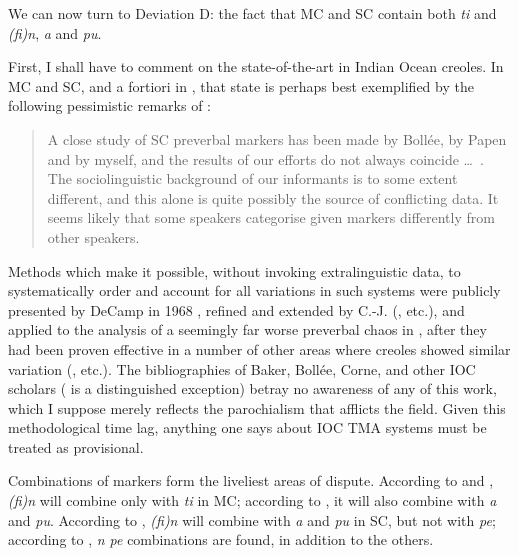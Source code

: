We can now turn to Deviation D: the fact that MC and SC contain both \textit{ti} and \textit{(fi)n}, \textit{a} and \textit{pu}.

First, I shall have to comment on the state-of-the-art in Indian Ocean creoles. In MC and SC, and a fortiori in , that state is perhaps best exemplified by the following pessimistic remarks of \citet[94--95]{Corne1977}:

\begin{quote}
A close study of SC preverbal markers has been made by Bollée, by Papen and by myself, and the results of our efforts do not always coincide \ldots~. The sociolinguistic background of our informants is to some extent different, and this alone is quite possibly the source of conflicting data. It seems likely that some speakers categorise given markers differently from other speakers.
\end{quote}

Methods which make it possible, without invoking extralinguistic data, to systematically order and account for all variations in such systems were publicly presented by DeCamp in 1968 \citep{DeCamp1971}, refined and extended by C.-J. \citeauthor{Bailey1973} (\citeyear{Bailey1973}, etc.), and applied to the analysis of a seemingly far worse preverbal chaos in \citet{Bickerton1975}, after they had been proven effective in a number of other areas where creoles showed similar variation (\citealt{Bickerton1971,Bickerton1973a,Bickerton1973b}, etc.). The bibliographies of Baker, Bollée, Corne, and other IOC scholars (\citealt{CarayolEtAl1977} is a distinguished exception) betray no awareness of any of this work, which I suppose merely reflects the parochialism that afflicts the field. Given this methodological time lag, anything one says about IOC TMA systems must be treated as provisional.

Combinations of markers form the liveliest areas of dispute. According to \citet{Baker1972} and \citet{Valdman1980}, \textit{(fi)n} will combine only with \textit{ti} in MC; according to \citet{Moorghen1975}, it will also combine with \textit{a} and \textit{pu}. According to \citet{Bollee1977}, \textit{(fi)n} will combine with \textit{a} and \textit{pu} in SC, but not with \textit{pe}; according to \citet{Corne1977}, \textit{n pe} com\-binations are found, in addition to the others.

